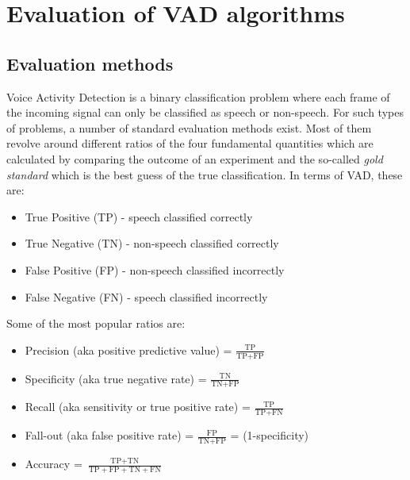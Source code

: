 
\chapter{Evaluation of VAD algorithms} %

\label{Chapter4} %



\section{Evaluation methods}

Voice Activity Detection is a binary classification problem where each frame of the incoming signal can only be classified as speech or non-speech. For such types of problems, a number of standard evaluation methods exist. Most of them revolve around different ratios of the four fundamental quantities which are calculated by comparing the outcome of an experiment and the so-called \emph{gold standard} which is the best guess of the true classification. In terms of VAD, these are:

\begin{itemize}
\item True Positive (TP) - speech classified correctly
\item True Negative (TN) - non-speech classified correctly
\item False Positive (FP) - non-speech classified incorrectly
\item False Negative (FN) - speech classified incorrectly
\end{itemize}

Some of the most popular ratios are:
\begin{itemize}
\item Precision (aka positive predictive value) = $\frac{\text{TP}}{\text{TP}+\text{FP}}$
\item Specificity (aka true negative rate) = $\frac{\text{TN}}{\text{TN}+\text{FP}}$
\item Recall (aka sensitivity or true positive rate) = $\frac{\text{TP}}{\text{TP}+\text{FN}}$
\item Fall-out (aka false positive rate) = $\frac{\text{FP}}{\text{TN}+\text{FP}}$ = (1-specificity)
\item Accuracy = $\frac{\text{TP}+\text{TN}}{\text{TP}+\text{FP}+\text{TN}+\text{FN}}$
\end{itemize}

